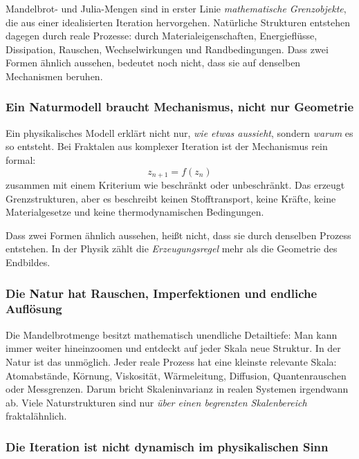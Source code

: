 Mandelbrot- und Julia-Mengen sind in erster Linie \emph{mathematische Grenzobjekte},
die aus einer idealisierten Iteration hervorgehen.
Natürliche Strukturen entstehen dagegen durch reale Prozesse:
durch Materialeigenschaften, Energieflüsse, Dissipation, Rauschen, Wechselwirkungen und Randbedingungen.
Dass zwei Formen ähnlich aussehen,
bedeutet noch nicht,
dass sie auf denselben Mechanismen beruhen.

\subsubsection*{Ein Naturmodell braucht Mechanismus, nicht nur Geometrie}

Ein physikalisches Modell erklärt nicht nur,
\emph{wie etwas aussieht},
sondern \emph{warum} es so entsteht.
Bei Fraktalen aus komplexer Iteration ist der Mechanismus rein formal:
\[
z_{n+1}=f(z_n)
\]
zusammen mit einem Kriterium wie
\glqq beschränkt oder unbeschränkt\grqq.
Das erzeugt Grenzstrukturen,
aber es beschreibt keinen Stofftransport,
keine Kräfte,
keine Materialgesetze
und keine thermodynamischen Bedingungen.

\begin{DidacticBox}
\label{box:optisch}
\small
Dass zwei Formen ähnlich aussehen,
heißt nicht,
dass sie durch denselben Prozess entstehen.
In der Physik zählt die \emph{Erzeugungsregel}
mehr als die Geometrie des Endbildes.
\end{DidacticBox}

\subsubsection*{Die Natur hat Rauschen, Imperfektionen und endliche Auflösung}

Die Mandelbrotmenge besitzt mathematisch unendliche Detailtiefe:
Man kann immer weiter hineinzoomen
und entdeckt auf jeder Skala neue Struktur.
In der Natur ist das unmöglich.
Jeder reale Prozess hat eine kleinste relevante Skala:
Atomabstände, Körnung, Viskosität, Wärmeleitung, Diffusion, Quantenrauschen oder Messgrenzen.
Darum bricht Skaleninvarianz in realen Systemen irgendwann ab.
Viele Naturstrukturen sind nur \emph{über einen begrenzten Skalenbereich} fraktalähnlich.

\subsubsection*{Die Iteration ist nicht dynamisch im physikalischen Sinn}

